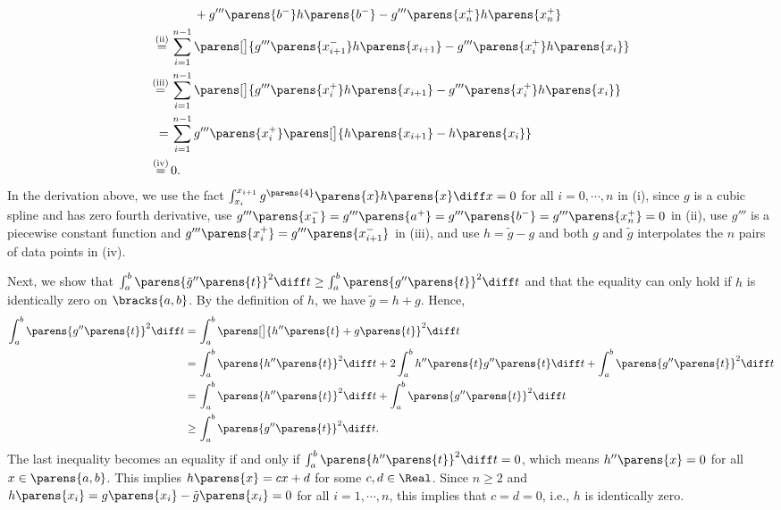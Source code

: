 \documentclass[12pt]{article}
\begin{document}
\begin{enumerate}[label=\textbf{\arabic*.}]
\begin{align*}
		& \qquad + g''' \parens{b^-} h \parens{b^-} - g''' \parens{x_{n}^+} h \parens{x_n^+} \\
		\stackrel{\text{(ii)}}{=} & \, \sum_{i=1}^{n-1} \parens[\big]{g''' \parens{x_{i+1}^-} h \parens{x_{i+1}} - g''' \parens{x_{i}^+} h \parens{x_{i}}} \\
		\stackrel{\text{(iii)}}{=} & \, \sum_{i=1}^{n-1} \parens[\big]{g''' \parens{x_{i}^+} h \parens{x_{i+1}} - g''' \parens{x_{i}^+} h \parens{x_{i}}} \\
		= & \,  \sum_{i=1}^{n-1} g''' \parens{x_{i}^+} \parens[\big]{ h \parens{x_{i+1}} - h \parens{x_{i}}} \\
		\stackrel{\text{(iv)}}{=} & \, 0.
	\end{align*}
	In the derivation above, we use the fact $\int_{x_i}^{x_{i+1}} g^{\parens{4}} \parens{x} h \parens{x} \diff x = 0$ for all $i = 0, \cdots, n$ in (i), since $g$ is a cubic spline and has zero fourth derivative, use $g''' \parens{x_1^-} = g''' \parens{a^+} = g''' \parens{b^-} = g''' \parens{x_n^+} = 0$ in (ii), use $g'''$ is a piecewise constant function and $g''' \parens{x_{i}^+} = g''' \parens{x_{i+1}^-}$ in (iii), and use $h = \tilde{g} - g$ and both $g$ and $\tilde{g}$ interpolates the $n$ pairs of data points in (iv). 
	
	Next, we show that $\int_a^b \parens{\tilde{g}'' \parens{t}}^2 \diff t \ge \int_a^b \parens{g'' \parens{t}}^2 \diff t$ and that the equality can only hold if $h$ is identically zero on $\bracks{a, b}$. By the definition of $h$, we have $\tilde{g} = h + g$. Hence,
	\begin{align*}
		\int_a^b \parens{g'' \parens{t}}^2 \diff t = & \, \int_a^b \parens[\big]{h'' \parens{t} + g \parens{t}}^2 \diff t \\
		= & \, \int_a^b \parens{h'' \parens{t}}^2 \diff t + 2 \int_a^b h'' \parens{t} g'' \parens{t} \diff t + \int_a^b \parens{g'' \parens{t}}^2 \diff t \\
		= & \, \int_a^b \parens{h'' \parens{t}}^2 \diff t + \int_a^b \parens{g'' \parens{t}}^2 \diff t \\
		\ge & \, \int_a^b \parens{g'' \parens{t}}^2 \diff t. 
	\end{align*}
	The last inequality becomes an equality if and only if $\int_a^b \parens{h'' \parens{t}}^2 \diff t = 0$, which means $h'' \parens{x} = 0$ for all $x \in \parens{a, b}$. This implies $h \parens{x} = cx + d$ for some $c, d \in \Real$. Since $n \ge 2$ and $h \parens{x_i} = g \parens{x_i} - \tilde{g} \parens{x_i} = 0$ for all $i = 1, \cdots, n$, this implies that $c = d = 0$, i.e., $h$ is identically zero. 
	

\end{enumerate}
\end{document}
